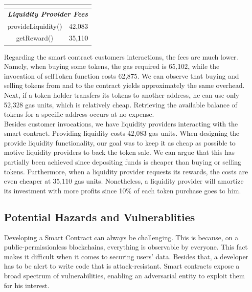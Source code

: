 \documentclass[12pt,a4paper]{article}
\begin{document}
\begin{table}[htpb]
\begin{center}
\begin{tabular}{cc}
        \multicolumn{1}{l}{}                                               & \multicolumn{1}{l}{}             \\ \hline
        \multicolumn{2}{|c|}{\textit{\textbf{Liquidity Provider Fees}}}                                       \\ \hline   
        \multicolumn{1}{|c|}{provideLiquidity()}                           & \multicolumn{1}{c|}{42,083}   \\ \hline
        \multicolumn{1}{|c|}{getReward()}                                  & \multicolumn{1}{c|}{35,110}   \\ \hline
        \end{tabular}
    \end{center}
\end{table}

Regarding the smart contract customers interactions, the fees are much lower.
Namely, when buying some tokens, the gas required is 65,102, while the
invocation of sellToken function costs 62,875. We can observe that buying and
selling tokens from and to the contract yields approximately the same overhead.
Next, if a token holder transfers its tokens to another address, he can use only
52,328 gas units, which is relatively cheap. Retrieving the available balance of
tokens for a specific address occurs at no expense. \\

Besides customer invocations, we have liquidity providers interacting with the
smart contract. Providing liquidity costs 42,083 gas units. When designing the
provide liquidity functionality, our goal was to keep it as cheap as possible to
motive liquidity providers to back the token sale. We can argue that this has
partially been achieved since depositing funds is cheaper than buying or selling
tokens. Furthermore, when a liquidity provider requests its rewards, the costs
are even cheaper at 35,110 gas units. Nonetheless, a liquidity provider will
amortize its investment with more profits since 10\% of each token purchase goes
to him. 

\subsection*{Potential Hazards and Vulnerablities}

Developing a Smart Contract can always be challenging. This is because, on a
public-permissionless blockchains, everything is observable by everyone. This
fact makes it difficult when it comes to securing users’ data. Besides that, a
developer has to be alert to write code that is attack-resistant. Smart
contracts expose a broad spectrum of vulnerabilities, enabling an adversarial
entity to exploit them for his interest.\\
\end{document}
